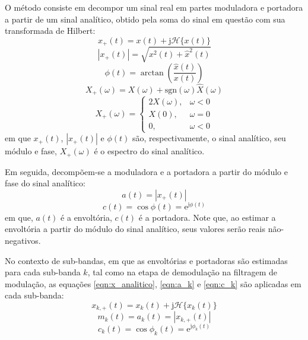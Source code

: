 O método consiste em decompor um sinal real em partes moduladora e portadora a
partir de um sinal analítico, obtido pela soma do sinal em questão com sua
transformada de Hilbert: 
\begin{equation} \label{eqn:x_analitico}
      x_{+}(t) = x(t) + \mathrm{j}\mathcal{H}\{x(t)\}
\end{equation}
\begin{equation}
    |x_{+}(t)| = \sqrt{x^2(t) + \hat{x}^2(t)}
\end{equation}
\begin{equation}
    \phi(t) = \arctan\left( \frac{\hat{x}(t)}{x(t)} \right)
\end{equation}
\begin{equation}
    X_{+}(\omega) = X(\omega) + \mathrm{sgn}(\omega)\hat{X}(\omega)
\end{equation}
\begin{equation}
    X_{+}(\omega) = \begin{cases}
        2X(\omega),& \omega < 0\\
        X(0), & \omega = 0\\
        0, & \omega < 0
        \end{cases}
\end{equation}
em que $x_{+}(t)$, $|x_{+}(t)|$ e $\phi(t)$ são, respectivamente, o sinal
analítico, seu módulo e fase, $X_{+}(\omega)$ é o espectro do sinal analítico.

Em seguida, decompõem-se a moduladora e a portadora a partir do módulo e fase do
sinal analítico:
\begin{equation}  \label{eqn:a_k}
      a(t) = |x_{+}(t)|
\end{equation}
\begin{equation}  \label{eqn:c_k}
      c(t) = \cos \phi(t) = \mathrm{e}^{\mathrm{j} \phi(t)}
\end{equation}
em que, $a(t)$ é a envoltória, $c(t)$ é a portadora. Note que, ao estimar a
envoltória a partir do módulo do sinal analítico, seus valores serão reais
não-negativos.

No contexto de sub-bandas, em que as envoltórias e portadoras são estimadas para
cada sub-banda $k$, tal como na etapa de demodulação na filtragem de modulação,
as equações \ref{eqn:x_analitico}, \ref{eqn:a_k} e \ref{eqn:c_k} são aplicadas
em cada sub-banda:
\begin{equation}
    x_{k,+}(t) = x_{k}(t) + \mathrm{j}\mathcal{H}\{x_k(t)\}
\end{equation}
\begin{equation}
    m_k(t) = a_k(t) = |x_{k,+}(t)|
\end{equation}
\begin{equation}
    c_k(t) = \cos \phi_k(t) = \mathrm{e}^{\mathrm{j} \phi_k(t)}
\end{equation}

